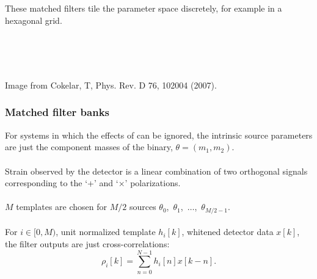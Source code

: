 \documentclass{beamer}
\begin{document}
\begin{frame}
\begin{columns}
\begin{column}{0.5\textwidth}
			These matched filters tile the parameter space discretely, for example in a hexagonal grid. \\~\\~\\~\\
		\end{column}
	\end{columns}
	\begin{flushleft}
		\scriptsize{Image from Cokelar, T, Phys. Rev. D 76, 102004 (2007).}
	\end{flushleft}
\end{frame}

\begin{frame}
	\frametitle{Matched filter banks}
	For systems in which the effects of can be ignored, the intrinsic source parameters are just the component masses of the binary, $\theta = (m_1, m_2)$. \\~\\

	Strain observed by the detector is a linear combination of two orthogonal signals corresponding to the `+' and `$\times$' polarizations. \\~\\

	$M$ templates are chosen for $M/2$ sources $\theta_0$,~$\theta_1$,~$\dots$,~$\theta_{M/2-1}$. \\~\\

	For $i \in [0, M)$, unit normalized template $h_i [k]$, whitened detector data $x[k]$, the filter outputs are just cross-correlations:
	$$
		\rho_i [k] = \sum_{n=0}^{N-1} h_{i}[n] x [k-n].
	$$
\end{frame}
\end{document}
